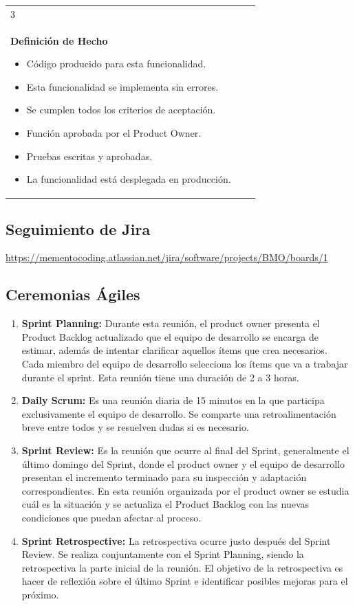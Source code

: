 \documentclass[12pt,a4paper]{article}
\begin{document}
\begin{center}
\begin{tabular}{| p{10cm} c p{2.5cm}|}
3 \\ 

\textbf{Definición de Hecho}

\begin{itemize}
\item Código producido para esta funcionalidad.
\item Esta funcionalidad se implementa sin errores.
\item Se cumplen todos los criterios de aceptación.
\item Función aprobada por el Product Owner.
\item Pruebas escritas y aprobadas.
\item La funcionalidad está desplegada en producción.
\end{itemize} & & \\
\hline  
\end{tabular}
\vspace{5mm}

\end{center}
\subsection{Seguimiento de Jira}
\url{https://mementocoding.atlassian.net/jira/software/projects/BMO/boards/1}
\subsection{Ceremonias Ágiles}
\begin{enumerate}
\item \textbf{Sprint Planning:} Durante esta reunión, el product owner presenta el Product Backlog actualizado que el equipo de desarrollo se encarga de estimar, además de intentar clarificar aquellos ítems que crea necesarios. Cada miembro del equipo de desarrollo selecciona los ítems que va a trabajar durante el sprint. Esta reunión tiene una duración de 2 a 3 horas.
\item \textbf{Daily Scrum:} Es una reunión diaria de 15 minutos en la que participa exclusivamente el equipo de desarrollo. Se comparte una retroalimentación breve entre todos y se resuelven dudas si es necesario.
\item \textbf{Sprint Review:} Es la reunión que ocurre al final del Sprint, generalmente el último domingo del Sprint, donde el product owner y el equipo de desarrollo presentan el incremento terminado para su inspección y adaptación correspondientes. En esta reunión organizada por el product owner se estudia cuál es la situación y se actualiza el Product Backlog con las nuevas condiciones que puedan afectar al proceso.
\item \textbf{Sprint Retrospective:} La retrospectiva ocurre justo después del Sprint Review. Se realiza conjuntamente con el Sprint Planning, siendo la retrospectiva la parte inicial de la reunión. El objetivo de la retrospectiva es hacer de reflexión sobre el último Sprint e identificar posibles mejoras para el próximo. 
\end{enumerate}
\end{document}
